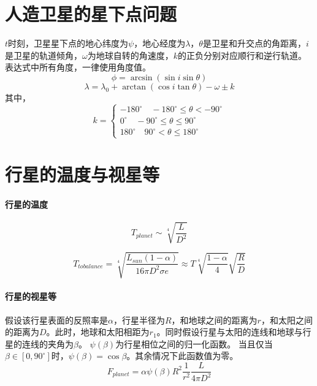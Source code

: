 \section{人造卫星的星下点问题}
$t$时刻，卫星星下点的地心纬度为$\psi$，地心经度为$\lambda$，$\theta$是卫星和升交点的角距离，$i$是卫星的轨道倾角，$\omega$为地球自转的角速度，$k$的正负分别对应顺行和逆行轨道。表达式中所有角度，一律使用角度值。
\begin{equation}
	\phi =\arcsin(\sin i \sin \theta)
\end{equation}
\begin{equation}
	\lambda =\lambda_{0}+\arctan (\cos i\tan \theta)-\omega \pm k
\end{equation}
其中，
\begin{equation}
	k = \left\{
	\begin{aligned}
		-180^\circ \quad -180^\circ \leq \theta < -90^\circ\\
		0^\circ \quad -90^\circ \leq \theta \leq 90^\circ\\
		180^\circ \quad 90^\circ < \theta \leq 180^\circ
	\end{aligned}
	\right
	.
\end{equation}

\section{行星的温度与视星等}
\paragraph{行星的温度}
\begin{equation}
	T_{planet} \sim \sqrt[4]{\frac{L}{D^2}}
\end{equation}

\begin{equation}
	T_{tobalance}=\sqrt[4]{\frac{L_{sun}(1-\alpha)}{16\pi D^2\sigma e}} \approx T\sqrt[4]{\frac{1-\alpha}{4}}\sqrt{\frac{R}{D}}
\end{equation}

\paragraph{行星的视星等}

假设该行星表面的反照率是$\alpha$，行星半径为$R$，和地球之间的距离为$r$，和太阳之间的距离为$D$。此时，地球和太阳相距为$r_{1}$。同时假设行星与太阳的连线和地球与行星的连线的夹角为$\beta$。
$\psi(\beta)$为行星相位之间的归一化函数。
当且仅当$\beta \in \left[0,90^\circ\right]$时，$\psi(\beta)=\cos \beta $。其余情况下此函数值为零。
\begin{equation}
	F_{planet}=\alpha \psi(\beta)R^2\frac{1}{r^2}\frac{L}{4\pi D^2}
\end{equation}

